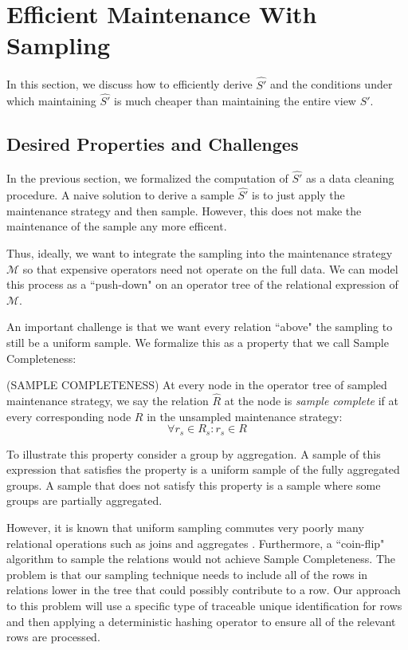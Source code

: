 \section{Efficient Maintenance With Sampling}
In this section, we discuss how to efficiently derive $\hat{S'}$ and the conditions under which
maintaining $\hat{S'}$ is much cheaper than maintaining the entire view $S'$.

\subsection{Desired Properties and Challenges}
In the previous section, we formalized the computation of $\hat{S'}$  as a data cleaning procedure.
A naive solution to derive a sample $\hat{S'}$ is to just apply the maintenance strategy and then sample.
However, this does not make the maintenance of the sample any more efficent.

Thus, ideally, we want to integrate the sampling into the maintenance strategy $\mathcal{M}$ so that expensive operators
need not operate on the full data.
We can model this process as a ``push-down" on an operator tree of the relational expression of $\mathcal{M}$.

An important challenge is that we want every relation ``above" the sampling to still be a uniform sample.
We formalize this as a property that we call Sample Completeness:
\begin{definition} (SAMPLE COMPLETENESS) At every node in the operator tree of sampled maintenance strategy, we say the relation $\hat{R}$ at the node is \emph{sample complete} if at every corresponding node $R$ in the unsampled maintenance strategy:
\[ \forall r_s \in R_s : r_s \in R \]
\end{definition}
To illustrate this property consider a group by aggregation.
A sample of this expression that satisfies the property is a uniform sample of the fully aggregated groups.
A sample that does not satisfy this property is a sample where some groups are partially aggregated.

However, it is known that uniform sampling commutes very poorly many relational operations such as joins and aggregates \cite{chaudhuri1999random}.
Furthermore, a ``coin-flip" algorithm to sample the relations would not achieve Sample Completeness.
The problem is that our sampling technique needs to include all of the rows in relations lower in the tree that could possibly contribute to a row.
Our approach to this problem will use a specific type of traceable unique identification for rows and then applying a deterministic hashing operator to ensure all of the relevant rows are processed.

